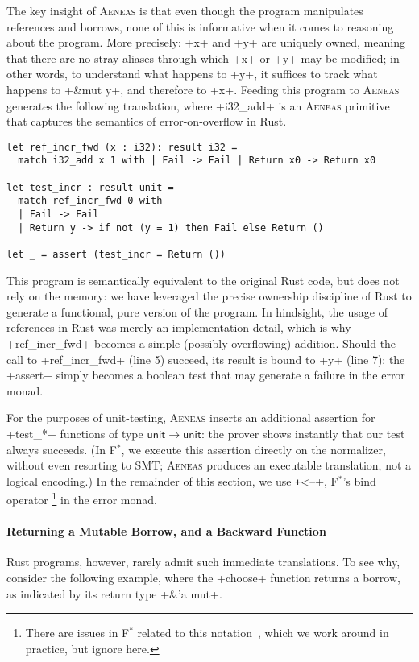 \documentclass[acmsmall,screen]{acmart}
\newcommand{\aeneas}{\textsc{Aeneas}\xspace}
\newcommand{\fstar}{F$^\ast$\xspace}
\newcommand\myparagraph[1]{\emph{#1}.\ }
\let\myparagraph\paragraph
\begin{document}
The key insight of \aeneas is that even though the program manipulates
references and borrows, none of this is informative when it comes to reasoning
about the program. More precisely: \li+x+ and \li+y+ are uniquely owned, meaning
that there are no stray aliases through which \li+x+ or \li+y+ may be modified;
in other words, to understand what happens to \li+y+, it suffices to track what
happens to \li+&mut y+, and therefore to \li+x+.
Feeding this program to \aeneas generates the following translation, where
\li+i32_add+ is an \aeneas primitive that captures the semantics of
error-on-overflow in Rust.

\begin{verbatim}
let ref_incr_fwd (x : i32): result i32 =
  match i32_add x 1 with | Fail -> Fail | Return x0 -> Return x0

let test_incr : result unit =
  match ref_incr_fwd 0 with
  | Fail -> Fail
  | Return y -> if not (y = 1) then Fail else Return ()

let _ = assert (test_incr = Return ())
\end{verbatim}
This program is semantically equivalent to the original Rust code, but does not
rely on the memory: we have leveraged the precise ownership discipline of Rust
to generate a functional, pure version of the program. In hindsight, the usage
of references in Rust was merely an implementation detail, which is why
\li+ref_incr_fwd+ becomes a simple (possibly-overflowing) addition. Should the
call to \li+ref_incr_fwd+ (line 5) succeed, its result is bound to \li+y+ (line
7); the \li+assert+ simply becomes a boolean test that may generate a failure
in the error monad.

For the purposes of unit-testing, \aeneas inserts an additional assertion for
\li+test_*+ functions of type $\mathsf{unit}\to\mathsf{unit}$: the prover shows instantly that our test
always succeeds. (In \fstar, we execute this assertion directly on the
normalizer, without even resorting to SMT; \aeneas produces an executable
translation, not a logical encoding.)
In the remainder of this section, we use \texttt+<--+, \fstar's bind
operator%
\footnote{There are issues in \fstar related to this
notation~\cite{fstar1288}, which we work around in practice, but ignore here.}
in the error monad.

\myparagraph{Returning a Mutable Borrow, and a Backward Function}
\label{sec:example:choose}
Rust programs, however, rarely admit such immediate translations. To see why,
consider the following example, where the \li+choose+ function returns a borrow,
as indicated by its return type \li+&'a mut+.
\end{document}
